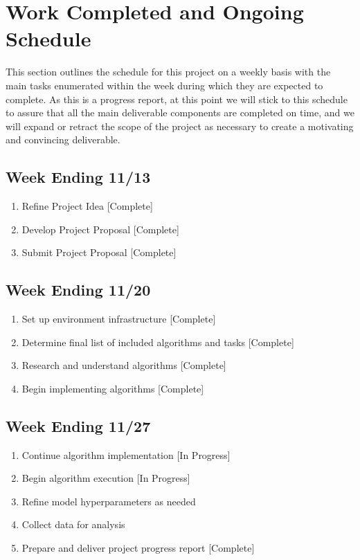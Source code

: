 \documentclass[conference]{IEEEtran}
\begin{document}
\section{Work Completed and Ongoing Schedule} \label{deliverables}
This section outlines the schedule for this project on a weekly basis with the main tasks enumerated within the week during which they are expected to complete.
As this is a progress report, at this point we will stick to this schedule to assure that all the main deliverable components are completed on time, and we will expand or retract the scope of the project as necessary to create a motivating and convincing deliverable.

\subsection{Week Ending 11/13}
\begin{enumerate}
    \item Refine Project Idea [Complete]
    \item Develop Project Proposal [Complete]
    \item Submit Project Proposal [Complete]
\end{enumerate}

\subsection{Week Ending 11/20}
\begin{enumerate}
    \item Set up environment infrastructure [Complete]
    \item Determine final list of included algorithms and tasks [Complete]
    \item Research and understand algorithms [Complete]
    \item Begin implementing algorithms [Complete]
\end{enumerate}

\subsection{Week Ending 11/27}
\begin{enumerate}
    \item Continue algorithm implementation [In Progress]
    \item Begin algorithm execution [In Progress]
    \item Refine model hyperparameters as needed
    \item Collect data for analysis
    \item Prepare and deliver project progress report [Complete]
\end{enumerate}
\end{document}
